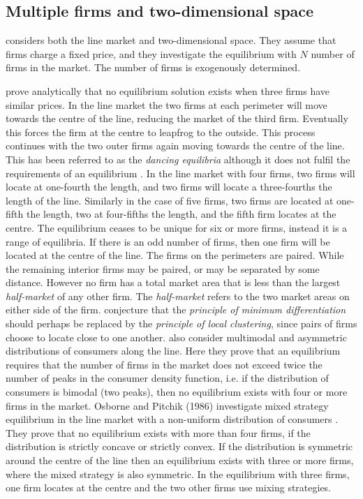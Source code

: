 \documentclass[preprint, 12pt]{elsarticle}
\begin{document}
\subsection{Multiple firms and two-dimensional space}

\citet{Eaton_Lipsey_1975} considers both the line market and two-dimensional space. They assume that firms charge a fixed price, and they investigate the equilibrium with $N$ number of firms in the market. The number of firms is exogenously determined.

\citet{Eaton_Lipsey_1975} prove analytically that no equilibrium solution exists when three firms have similar prices. In the line market the two firms at each perimeter will move towards the centre of the line, reducing the market of the third firm. Eventually this forces the firm at the centre to leapfrog to the outside. This process continues with the two outer firms again moving towards the centre of the line. This has been referred to as the \emph{dancing equilibria} although it does not fulfil the requirements of an equilibrium \citep{Eiselt_2011}. In the line market with four firms, two firms will locate at one-fourth the length, and two firms will locate a three-fourths the length of the line. Similarly in the case of five firms, two firms are located at one-fifth the length, two at four-fifths the length, and the fifth firm locates at the centre. The equilibrium ceases to be unique for six or more firms, instead it is a range of equilibria. If there is an odd number of firms, then one firm will be located at the centre of the line. The firms on the perimeters are paired. While the remaining interior firms may be paired, or may be separated by some distance. However no firm has a total market area that is less than the largest \emph{half-market} of any other firm. The \emph{half-market} refers to the two market areas on either side of the firm. \citet{Eaton_Lipsey_1975} conjecture that the \emph{principle of minimum differentiation} should perhaps be replaced by the \emph{principle of local clustering}, since pairs of firms choose to locate close to one another. \citet{Eaton_Lipsey_1975} also consider multimodal and asymmetric distributions of consumers along the line. Here they prove that an equilibrium requires that the number of firms in the market does not exceed twice the number of peaks in the consumer density function, i.e. if the distribution of consumers is bimodal (two peaks), then no equilibrium exists with four or more firms in the market. Osborne and Pitchik (1986) investigate mixed strategy equilibrium in the line market with a non-uniform distribution of consumers \citep{Eiselt_2011}. They prove that no equilibrium exists with more than four firms, if the distribution is strictly concave or strictly convex. If the distribution is symmetric around the centre of the line then an equilibrium exists with three or more firms, where the mixed strategy is also symmetric. In the equilibrium with three firms, one firm locates at the centre and the two other firms use mixing strategies.
\end{document}
